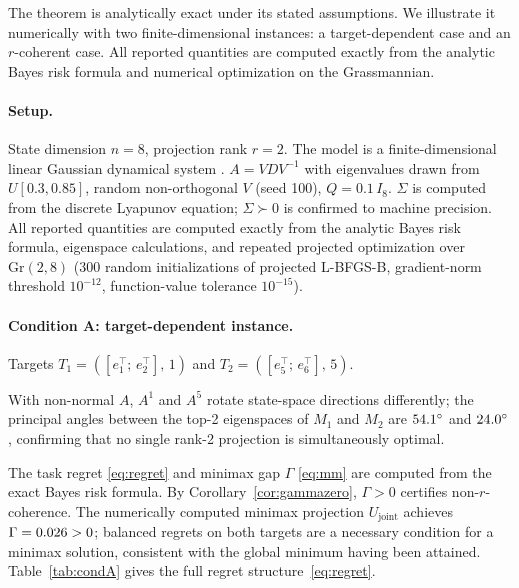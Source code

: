 \documentclass[final,3p,times]{elsarticle}
\newcommand{\Gr}{\mathrm{Gr}}
\begin{document}
The theorem is analytically exact under its stated assumptions.
We illustrate it numerically with two finite-dimensional instances:
a target-dependent case and an $r$-coherent case.
All reported quantities are computed exactly from the analytic Bayes risk
formula and numerical optimization on the Grassmannian.

\paragraph{Setup.}
State dimension $n=8$, projection rank $r=2$.
The model is a finite-dimensional linear Gaussian dynamical system
\cite{Kalman1960}.
$A = VDV^{-1}$ with eigenvalues drawn from $U[0.3,0.85]$, random
non-orthogonal $V$ (seed 100), $Q = 0.1\,I_8$.
$\Sigma$ is computed from the discrete Lyapunov equation; $\Sigma\succ 0$
is confirmed to machine precision.
All reported quantities are computed exactly from the analytic Bayes risk
formula, eigenspace calculations, and repeated projected optimization over
$\Gr(2,8)$ (300 random initializations of projected L-BFGS-B, gradient-norm
threshold $10^{-12}$, function-value tolerance $10^{-15}$).

\paragraph{Condition A: target-dependent instance.}
{\sloppy
Targets $T_1 = ([e_1^\top;\,e_2^\top],\,1)$ and
$T_2 = ([e_5^\top;\,e_6^\top],\,5)$.\par}
With non-normal $A$, $A^1$ and $A^5$ rotate state-space directions
differently; the principal angles \cite{BjorckGolub1973} between the top-2
eigenspaces of $M_1$ and $M_2$ are $54.1^\circ$ and
$24.0^\circ$, confirming that no single rank-2 projection is
simultaneously optimal.

The task regret \eqref{eq:regret} and minimax gap $\Gamma$
\eqref{eq:mm} are computed from the exact Bayes risk formula.
By Corollary~\ref{cor:gammazero}, $\Gamma>0$ certifies non-$r$-coherence.
The numerically computed minimax projection $U_{\mathrm{joint}}$
achieves $\Gamma=0.026>0$; balanced regrets on both targets
are a necessary condition for a minimax solution, consistent with the
global minimum having been attained.
Table~\ref{tab:condA} gives the full regret structure~\eqref{eq:regret}.
\end{document}
